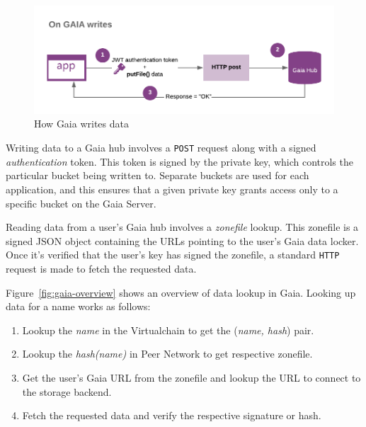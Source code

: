 		\begin{figure}[h]
			\includegraphics[width=\linewidth]{figures/gaia-writes}
			\caption{\label{fig:gaia-writes} How Gaia writes data\protect\footnotemark}
		\end{figure}
		
		Writing data to a Gaia hub involves a \texttt{POST} request along with a signed \textit{authentication} token. This token is signed by the private key, which controls the particular bucket being written to. Separate buckets are used for each application, and this ensures that a given private key grants access only to a specific bucket on the Gaia Server.
		
		Reading data from a user's Gaia hub involves a \textit{zonefile} lookup. This zonefile is a signed JSON object containing the URLs pointing to the user's Gaia data locker. Once it's verified that the user's key has signed the zonefile, a standard \texttt{HTTP} request is made to fetch the requested data.
		
		Figure~\ref{fig:gaia-overview} shows an overview of data lookup in Gaia. Looking up data for a name works as follows:
		
		\begin{enumerate}
			\item Lookup the \textit{name} in the Virtualchain to get the (\textit{name, hash}) pair.
			\item Lookup the \textit{hash(name)} in Peer Network to get respective zonefile.
			\item Get the user's Gaia URL from the zonefile and lookup the URL to connect to the storage backend.
			\item Fetch the requested data and verify the respective signature or hash.
		\end{enumerate}
		
